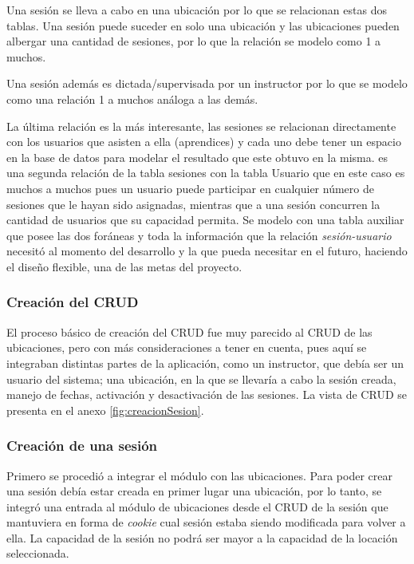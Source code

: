 Una sesión se lleva a cabo en una ubicación por lo que se relacionan estas dos tablas. Una sesión puede suceder en solo una ubicación y las ubicaciones pueden albergar una cantidad de sesiones, por lo que la relación se modelo como 1 a muchos.

Una sesión además es dictada/supervisada por un instructor por lo que se modelo como una relación 1 a muchos análoga a las demás.

La última relación es la más interesante, las sesiones se relacionan directamente con los usuarios que asisten a ella (aprendices) y cada uno debe tener un espacio en la base de datos para modelar el resultado que este obtuvo en la misma. es una segunda relación de la tabla sesiones con la tabla Usuario que en este caso es muchos a muchos pues un usuario puede participar en cualquier número de sesiones que le hayan sido asignadas, mientras que a una sesión concurren la cantidad de usuarios que su capacidad permita. Se modelo con una tabla auxiliar que posee las dos foráneas y toda la información que la relación \emph{sesión-usuario} necesitó al momento del desarrollo y la que pueda necesitar en el futuro, haciendo el diseño flexible, una de las metas del proyecto.

\subsubsection{Creación del CRUD}

El proceso básico de creación del CRUD fue muy parecido al CRUD de las ubicaciones, pero con más consideraciones a tener en cuenta, pues aquí se integraban distintas partes de la aplicación, como un instructor, que debía ser un usuario del sistema; una ubicación, en la que se llevaría a cabo la sesión creada, manejo de fechas, activación y desactivación de las sesiones. La vista de CRUD se presenta en el anexo \ref{fig:creacionSesion}.

\subsubsection{Creación de una sesión}

Primero se procedió a integrar el módulo con las ubicaciones. Para poder crear una sesión debía estar creada en primer lugar una ubicación, por lo tanto, se integró una entrada al módulo de ubicaciones desde el CRUD de la sesión que mantuviera en forma de \emph{cookie} cual sesión estaba siendo modificada para volver a ella. La capacidad de la sesión no podrá ser mayor a la capacidad de la locación seleccionada.

